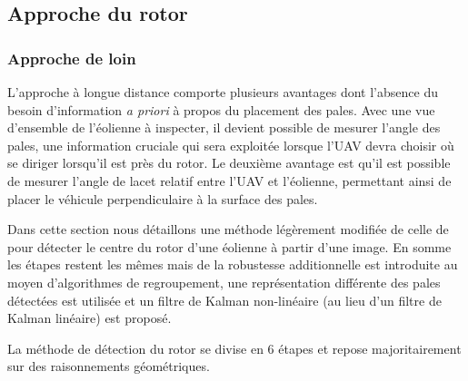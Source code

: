 \subsection{Approche du rotor}

\subsubsection{Approche de loin}

L'approche à longue distance comporte plusieurs avantages dont l'absence du besoin d'information \textit{a priori} à propos du placement des pales. Avec une vue d'ensemble de l'éolienne à inspecter, il devient possible de mesurer l'angle des pales, une information cruciale qui sera exploitée lorsque l'UAV devra choisir où se diriger lorsqu'il est près du rotor. Le deuxième avantage est qu'il est possible de mesurer l'angle de lacet relatif entre l'UAV et l'éolienne, permettant ainsi de placer le véhicule perpendiculaire à la surface des pales.

Dans cette section nous détaillons une méthode légèrement modifiée de celle de \citep{Stokkeland2015} pour détecter le centre du rotor d'une éolienne à partir d'une image. En somme les étapes restent les mêmes mais de la robustesse additionnelle est introduite au moyen d'algorithmes de regroupement, une représentation différente des pales détectées est utilisée et un filtre de Kalman non-linéaire (au lieu d'un filtre de Kalman linéaire) est proposé.

La méthode de détection du rotor se divise en 6 étapes et repose majoritairement sur des raisonnements géométriques.


